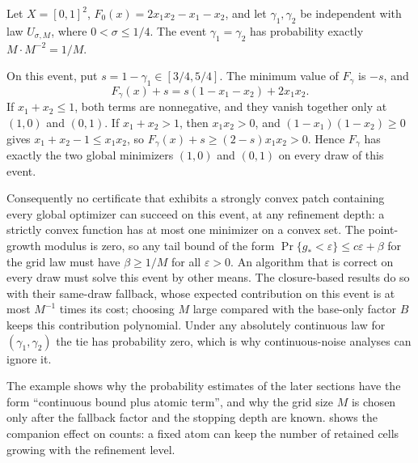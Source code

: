 \begin{example}\label{ex:model:tie}
Let $X=[0,1]^2$, $F_0(x)=2x_1x_2-x_1-x_2$, and let $\gamma_1,\gamma_2$ be
independent with law $U_{\sigma,M}$, where $0<\sigma\le1/4$. The event
$\gamma_1=\gamma_2$ has probability exactly $M\cdot M^{-2}=1/M$.

On this event, put $s=1-\gamma_1\in[3/4,5/4]$. The minimum value of
$F_\gamma$ is $-s$, and
\[
 F_\gamma(x)+s=s(1-x_1-x_2)+2x_1x_2 .
\]
If $x_1+x_2\le1$, both terms are nonnegative, and they vanish together only
at $(1,0)$ and $(0,1)$. If $x_1+x_2>1$, then $x_1x_2>0$, and
$(1-x_1)(1-x_2)\ge0$ gives $x_1+x_2-1\le x_1x_2$, so
$F_\gamma(x)+s\ge(2-s)x_1x_2>0$. Hence $F_\gamma$ has exactly the two
global minimizers $(1,0)$ and $(0,1)$ on every draw of this event.

Consequently no certificate that exhibits a strongly convex patch containing
every global optimizer can succeed on this event, at any refinement depth:
a strictly convex function has at most one minimizer on a convex set. The
point-growth modulus is zero, so any tail bound of the form
$\Pr\{g_*<\varepsilon\}\le c\varepsilon+\beta$ for the grid law must have
$\beta\ge1/M$ for all $\varepsilon>0$. An algorithm that is correct on every
draw must solve this event by other means. The closure-based results do so
with their same-draw fallback, whose expected contribution on this event is
at most $M^{-1}$ times its cost; choosing $M$ large compared with the
base-only factor $B$ keeps this contribution polynomial. Under any
absolutely continuous law for $(\gamma_1,\gamma_2)$ the tie has probability
zero, which is why continuous-noise analyses can ignore it.
\end{example}

The example shows why the probability estimates of the later sections have
the form ``continuous bound plus atomic term'', and why the grid size $M$ is
chosen only after the fallback factor and the stopping depth are known.
 shows the companion effect on counts: a fixed atom can
keep the number of retained cells growing with the refinement level.
